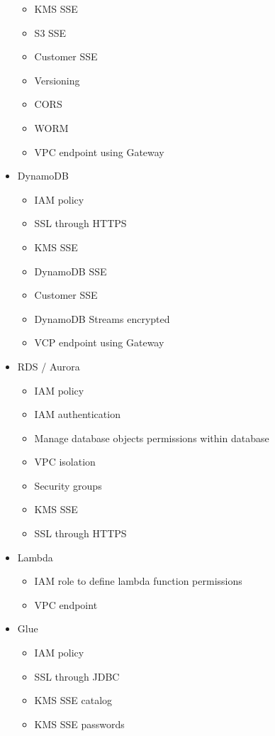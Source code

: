 \documentclass[../../main.tex]{subfiles}
\begin{document}
\begin{itemize}
\begin{itemize}
        \item KMS SSE
        \item S3 SSE
        \item Customer SSE
        \item Versioning
        \item CORS
        \item WORM
        \item VPC endpoint using Gateway
    \end{itemize}
    \item DynamoDB
    \begin{itemize}
        \item IAM policy
        \item SSL through HTTPS
        \item KMS SSE
        \item DynamoDB SSE
        \item Customer SSE
        \item DynamoDB Streams encrypted
        \item VCP endpoint using Gateway
    \end{itemize}
    \item RDS / Aurora
    \begin{itemize}
        \item IAM policy
        \item IAM authentication
        \item Manage database objects permissions within database
        \item VPC isolation
        \item Security groups
        \item KMS SSE
        \item SSL through HTTPS
    \end{itemize}
    \item Lambda
    \begin{itemize}
        \item IAM role to define lambda function permissions
        \item VPC endpoint
    \end{itemize}
    \item Glue
    \begin{itemize}
        \item IAM policy
        \item SSL through JDBC
        \item KMS SSE catalog
        \item KMS SSE passwords

\end{itemize}
\end{itemize}
\end{document}

